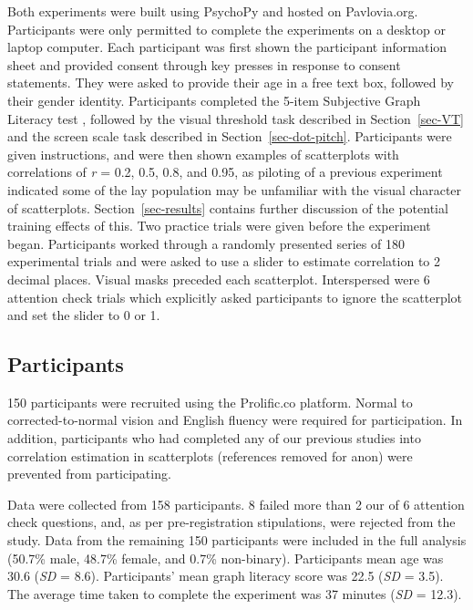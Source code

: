 \documentclass[manuscript, review, anonymous, screen]{acmart}
\begin{document}
Both experiments were built using PsychoPy \citep{pierce_2019} and
hosted on Pavlovia.org. Participants were only permitted to complete the
experiments on a desktop or laptop computer. Each participant was first
shown the participant information sheet and provided consent through key
presses in response to consent statements. They were asked to provide
their age in a free text box, followed by their gender identity.
Participants completed the 5-item Subjective Graph Literacy test
\citep{garcia_2016}, followed by the visual threshold task described in
Section~\ref{sec-VT} and the screen scale task described in
Section~\ref{sec-dot-pitch}. Participants were given instructions, and
were then shown examples of scatterplots with correlations of \emph{r} =
0.2, 0.5, 0.8, and 0.95, as piloting of a previous experiment indicated
some of the lay population may be unfamiliar with the visual character
of scatterplots. Section~\ref{sec-results} contains further discussion
of the potential training effects of this. Two practice trials were
given before the experiment began. Participants worked through a
randomly presented series of 180 experimental trials and were asked to
use a slider to estimate correlation to 2 decimal places. Visual masks
preceded each scatterplot. Interspersed were 6 attention check trials
which explicitly asked participants to ignore the scatterplot and set
the slider to 0 or 1.

\hypertarget{sec-participants}{%
\subsection{Participants}\label{sec-participants}}

150 participants were recruited using the Prolific.co platform. Normal
to corrected-to-normal vision and English fluency were required for
participation. In addition, participants who had completed any of our
previous studies into correlation estimation in scatterplots (references
removed for anon) were prevented from participating.

Data were collected from 158 participants. 8 failed more than 2 our of 6
attention check questions, and, as per pre-registration stipulations,
were rejected from the study. Data from the remaining 150 participants
were included in the full analysis (50.7\% male, 48.7\% female, and
0.7\% non-binary). Participants mean age was 30.6 (\emph{SD} = 8.6).
Participants' mean graph literacy score was 22.5 (\emph{SD} = 3.5). The
average time taken to complete the experiment was 37 minutes (\emph{SD}
= 12.3).
\end{document}
